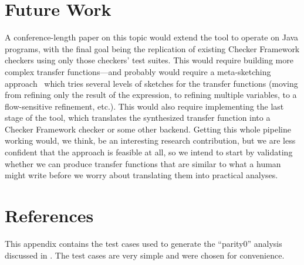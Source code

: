 \documentclass[10pt,conference]{IEEEtran}
\begin{document}
\section{Future Work}
\label{sec-fw}

A conference-length paper on this topic would extend the tool to operate
on Java programs, with the final goal being the replication of
existing Checker Framework checkers using only those checkers'
test suites. This would require building more
complex transfer functions---and probably would require
a meta-sketching approach~\cite{metasketching} which tries several levels of
sketches for the transfer functions (moving from refining only the result of the expression, to
refining multiple variables, to a flow-sensitive refinement, etc.).
This would also require implementing the last stage of the tool, which
translates the synthesized transfer function into a Checker Framework
checker or some other backend. Getting this whole pipeline working would,
we think, be an interesting research contribution, but we are less
confident that the approach is feasible at all, so we intend to start
by validating whether we can produce transfer functions that are
similar to what a human might write before we worry about translating
them into practical analyses.

\section{References}

\begingroup
\renewcommand{\section}[2]{}%



%
%
\endgroup

\appendix

This appendix contains the test cases used to generate the ``parity0''
analysis discussed in . The test cases are very simple and
were chosen for convenience.
\end{document}
